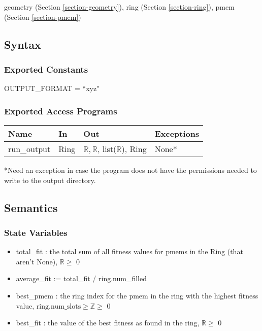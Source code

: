 \documentclass[12pt, titlepage]{article}
\begin{document}
geometry (Section \ref{section-geometry}),
ring (Section \ref{section-ring}),
pmem (Section \ref{section-pmem})

\subsection{Syntax}

\subsubsection{Exported Constants}

OUTPUT\_FORMAT = ``xyz"

\subsubsection{Exported Access Programs}

\begin{center}
	\begin{tabular}{p{2cm} p{4cm} p{4cm} p{2cm}}
		\hline
		\textbf{Name} & \textbf{In} & \textbf{Out} & \textbf{Exceptions} \\
		\hline
		run\_output & Ring & $\mathbb{R}, \mathbb{R}$, list($\mathbb{R}$), Ring 
		& None* \\
		\hline
	\end{tabular}
\end{center}

*Need an exception in case the program does not have the permissions 
needed to write to the output directory.

\subsection{Semantics}

\subsubsection{State Variables}

\begin{itemize}
\item total\_fit : the total sum of all fitness values for pmems in the Ring 
(that aren't None), $\mathbb{R} \geq$ 0
\item average\_fit := total\_fit / ring.num\_filled
\item best\_pmem : the ring index for the pmem in the ring with the highest 
fitness value, $\text{ring.num\_slots} \geq \mathbb{Z} \geq$ 0
\item best\_fit : the value of the best fitness as found in the ring,  
$\mathbb{R} \geq$ 0
\end{itemize}
\end{document}
